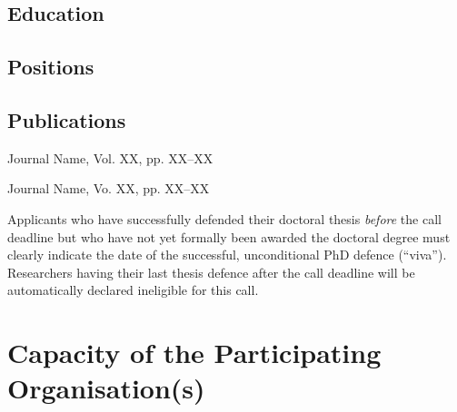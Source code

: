 \documentclass[12pt,draftproposal]{msca-pf}
\begin{document}
\subsection*{Education}
\label{ssc:cv:education}

\begin{cvitem}
\end{cvitem}

\subsection*{Positions}

\begin{cvitem}
\end{cvitem}


\subsection*{Publications}

\begin{cvitem}
                  {Journal Name, Vol. XX, pp. XX--XX}
\end{cvitem}

                      {Journal Name, Vo. XX, pp. XX--XX}

\begin{mscaexplanation}
Applicants who have successfully defended their doctoral thesis \emph{before} the call
deadline but who have not yet formally been awarded the doctoral degree must
clearly indicate the date of the successful, unconditional PhD defence (``viva'').
Researchers having their last thesis defence after the call deadline will be automatically
declared ineligible for this call.
\end{mscaexplanation}

\section{Capacity of the Participating Organisation(s)}
\label{sc:organisations}
\end{document}
